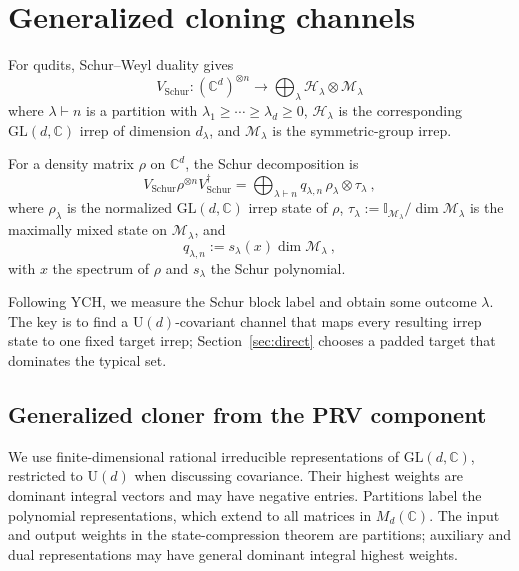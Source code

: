 \documentclass[a4paper,onecolumn,11pt]{quantumarticle}
\def\h{\mathcal{H}}
\def\id{\mathbb{I}}
\def\map{\mathcal}
\begin{document}
\section{Generalized cloning channels}\label{sec:cloner}

For qudits, Schur--Weyl duality gives
\begin{equation}
    V_\mathrm{Schur}: (\mathbb C^d)^{\otimes n}\to\bigoplus_\lambda\h_\lambda\otimes\map{M}_\lambda
\end{equation}
where $\lambda\vdash n$ is a partition with
$\lambda_1\ge\cdots\ge\lambda_d\ge0$,
$\h_\lambda$ is the corresponding $\mathrm{GL}(d,\mathbb C)$ irrep
of dimension $d_\lambda$, and $\map M_\lambda$ is the symmetric-group irrep.

For a density matrix $\rho$ on $\mathbb{C}^d$, the Schur decomposition is
\begin{equation}\label{eq:schur_d}
    V_\mathrm{Schur}\rho^{\otimes n}V_\mathrm{Schur}^\dagger
    = \bigoplus_{\lambda\vdash n} q_{\lambda,n}\,
    \rho_\lambda\otimes\tau_\lambda\ ,
\end{equation}
where $\rho_\lambda$ is the normalized $\mathrm{GL}(d,\mathbb{C})$ irrep
state of $\rho$, $\tau_\lambda:=\id_{\map M_\lambda}/\dim\map M_\lambda$
is the maximally mixed state on $\map M_\lambda$, and
\begin{equation}\label{eq:qlambda_def}
    q_{\lambda,n} := s_\lambda(x)\dim\map{M}_\lambda\ ,
\end{equation}
with $x$ the spectrum of $\rho$ and $s_\lambda$ the Schur polynomial.

Following YCH, we measure the Schur block label and obtain some outcome $\lambda$. The key is to find a $\mathrm{U}(d)$-covariant channel that maps every resulting irrep state to one fixed target irrep; Section~\ref{sec:direct} chooses a padded target that dominates the typical set.


\subsection{Generalized cloner from the PRV component}\label{sec:definition}
We use finite-dimensional rational irreducible representations of
$\mathrm{GL}(d,\mathbb C)$, restricted to $\mathrm U(d)$ when discussing
covariance. Their highest weights are dominant integral vectors and may
have negative entries. Partitions label the polynomial representations,
which extend to all matrices in $M_d(\mathbb C)$. The input and output
weights in the state-compression theorem are partitions; auxiliary and
dual representations may have general dominant integral highest weights.
\end{document}
